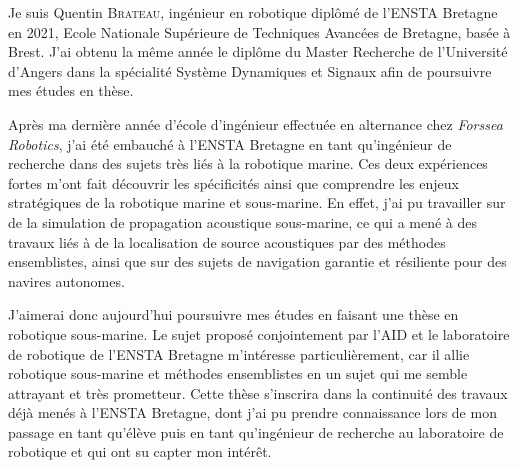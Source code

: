 \documentclass[11pt, a4paper]{awesome-cv}
\begin{document}
	\makecvheader[C]


	\makelettertitle

	\begin{cvletter}

		Je suis Quentin \textsc{Brateau}, ingénieur en robotique diplômé de l'\textsc{ENSTA} Bretagne en 2021, Ecole Nationale Supérieure de Techniques Avancées de Bretagne, basée à Brest. J'ai obtenu la même année le diplôme du Master Recherche de l'Université d'Angers dans la spécialité Système Dynamiques et Signaux afin de poursuivre mes études en thèse.
		
		Après ma dernière année d'école d'ingénieur effectuée en alternance chez \textit{Forssea Robotics}, j'ai été embauché à l'\textsc{ENSTA} Bretagne en tant qu'ingénieur de recherche dans des sujets très liés à la robotique marine. Ces deux expériences fortes m'ont fait découvrir les spécificités ainsi que comprendre les enjeux stratégiques de la robotique marine et sous-marine. En effet, j'ai pu travailler sur de la simulation de propagation acoustique sous-marine, ce qui a mené à des travaux liés à de la localisation de source acoustiques par des méthodes ensemblistes, ainsi que sur des sujets de navigation garantie et résiliente pour des navires autonomes.

		J'aimerai donc aujourd'hui poursuivre mes études en faisant une thèse en robotique sous-marine. Le sujet proposé conjointement par l'\textsc{AID} et le laboratoire de robotique de l'\textsc{ENSTA} Bretagne m'intéresse particulièrement, car il allie robotique sous-marine et méthodes ensemblistes en un sujet qui me semble attrayant et très prometteur. Cette thèse s'inscrira dans la continuité des travaux déjà menés à l'\textsc{ENSTA} Bretagne, dont j'ai pu prendre connaissance lors de mon passage en tant qu'élève puis en tant qu'ingénieur de recherche au laboratoire de robotique et qui ont su capter mon intérêt.

	\end{cvletter}

	\makeletterclosing
\end{document}
